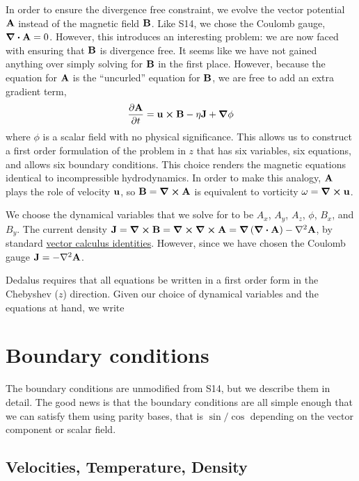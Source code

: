 \documentclass{jpp}
\begin{document}
In order to ensure the divergence free constraint, we evolve the vector potential $\vb{A}$ instead of the magnetic field $\vb{B}$. Like S14, we chose the Coulomb gauge,  $\div{\vb{A}} = 0$. However, this introduces an interesting problem: we are now faced with ensuring that $\vb{B}$ is divergence free. It seems like we have not gained anything over simply solving for $\vb{B}$ in the first place. However, because the equation for $\vb{A}$ is the ``uncurled'' equation for $\vb{B}$, we are free to add an extra gradient term,
\begin{equation}
  \label{eq:A_with_phi}
  \frac{\partial \vb{A}}{\partial t} = \vb{u} \cross \vb{B} - \eta \vb{J} + \grad{\phi}
\end{equation}
where $\phi$ is a scalar field with no physical significance. This allows us to construct a first order formulation of the problem in $z$ that has six variables, six equations, and allows six boundary conditions. This choice renders the magnetic equations identical to incompressible hydrodynamics. In order to make this analogy, $\vb{A}$ plays the role of velocity $\vb{u}$, so $\vb{B} = \curl{\vb{A}}$ is equivalent to vorticity $\vb{\omega} = \curl{\vb{u}}$.

We choose the dynamical variables that we solve for to be $A_x$, $A_y$, $A_z$, $\phi$, $B_x$, and $B_y$. The current density $\vb{J} = \curl{\vb{B}} = \curl{\curl{\vb{A}}} = \grad{\left(\div{\vb{A}}\right)} - \laplacian{\vb{A}}$, by standard \href{https://en.wikipedia.org/wiki/Vector_calculus_identities}{vector calculus identities}. However, since we have chosen the Coulomb gauge $\vb{J} = - \laplacian{\vb{A}}$.

Dedalus requires that all equations be written in a first order form in the Chebyshev ($z$) direction. Given our choice of dynamical variables and the equations at hand, we write 

\section{Boundary conditions}
\label{sec:bc}

The boundary conditions are unmodified from S14, but we describe them in detail. The good news is that the boundary conditions are all simple enough that we can satisfy them using parity bases, that is $\sin/\cos$ depending on the vector component or scalar field. 

\subsection{Velocities,  Temperature, Density}
\label{sec:vel_bc}
\end{document}
